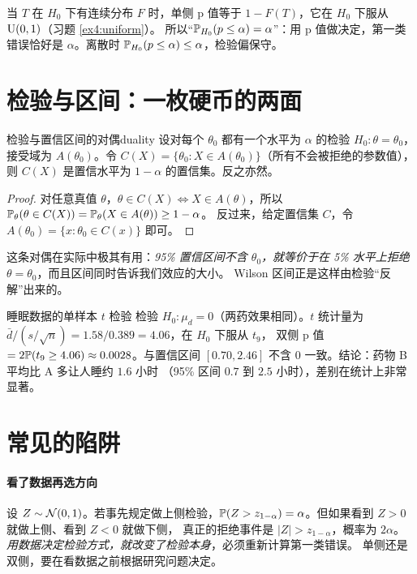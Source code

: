 当 $T$ 在 $H_0$ 下有连续分布 $F$ 时，单侧 p 值等于 $1-F(T)$，它在 $H_0$ 下服从 $\Unif(0,1)$（习题 \ref{ex4:uniform}）。
所以“$\P_{H_0}(p\le\alpha)=\alpha$”：用 p 值做决定，第一类错误恰好是 $\alpha$。离散时 $\P_{H_0}(p\le\alpha)\le\alpha$，检验偏保守。

\section{检验与区间：一枚硬币的两面}

\begin{theorem}{检验与置信区间的对偶}{duality}
设对每个 $\theta_0$ 都有一个水平为 $\alpha$ 的检验 $H_0:\theta=\theta_0$，接受域为 $A(\theta_0)$。令
$C(X)=\{\theta_0:X\in A(\theta_0)\}$（所有不会被拒绝的参数值），则 $C(X)$ 是置信水平为 $1-\alpha$ 的置信集。反之亦然。
\end{theorem}
\begin{proof}
对任意真值 $\theta$，$\theta\in C(X)\iff X\in A(\theta)$，所以 $\P_\theta(\theta\in C(X))=\P_\theta(X\in A(\theta))\ge1-\alpha$。
反过来，给定置信集 $C$，令 $A(\theta_0)=\{x:\theta_0\in C(x)\}$ 即可。
\end{proof}

这条对偶在实际中极其有用：\emph{95\% 置信区间不含 $\theta_0$，就等价于在 5\% 水平上拒绝 $\theta=\theta_0$}，而且区间同时告诉我们效应的大小。
Wilson 区间正是这样由检验“反解”出来的。

\begin{casestudy}{睡眠数据的单样本 $t$ 检验}
检验 $H_0:\mu_d=0$（两药效果相同）。$t$ 统计量为 $\bar d/(s/\sqrt n)=1.58/0.389=4.06$，在 $H_0$ 下服从 $t_9$，
双侧 p 值 $=2\P(t_9\ge4.06)\approx0.0028$。与置信区间 $[0.70,2.46]$ 不含 $0$ 一致。结论：药物 B 平均比 A 多让人睡约 $1.6$ 小时
（95\% 区间 $0.7$ 到 $2.5$ 小时），差别在统计上非常显著。
\end{casestudy}

\section{常见的陷阱}

\paragraph{看了数据再选方向}
设 $Z\sim\N(0,1)$。若事先规定做上侧检验，$\P(Z>z_{1-\alpha})=\alpha$。但如果看到 $Z>0$ 就做上侧、看到 $Z<0$ 就做下侧，
真正的拒绝事件是 $|Z|>z_{1-\alpha}$，概率为 $2\alpha$。\emph{用数据决定检验方式，就改变了检验本身}，必须重新计算第一类错误。
单侧还是双侧，要在看数据之前根据研究问题决定。

